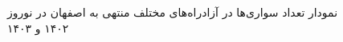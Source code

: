 \documentclass[a4paper, 12pt]{article}
\begin{document}
\begin{figure}[htbp]
    \centering
    \caption{نمودار تعداد سواری‌ها در آزادراه‌های مختلف منتهی به اصفهان در نوروز ۱۴۰۲ و ۱۴۰۳}
\end{figure}
\end{document}
